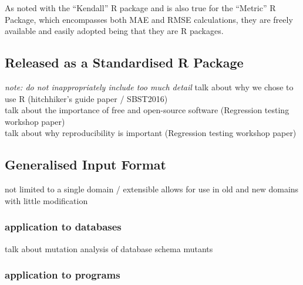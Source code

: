 As noted with the ``Kendall'' R package and is also true for the ``Metric'' R Package, which
encompasses both MAE and RMSE calculations, they are freely available and easily adopted being
that they are R packages.

\subsection{Released as a Standardised R Package}
\textit{note: do not inappropriately include too much detail}
talk about why we chose to use R (hitchhiker's guide paper / SBST2016)\\
talk about the importance of free and open-source software (Regression testing workshop paper)\\
talk about why reproducibility is important (Regression testing workshop paper)


\subsection{Generalised Input Format}
not limited to a single domain / extensible
allows for use in old and new domains with little modification
    \subsubsection{application to databases}
    talk about mutation analysis of database schema mutants
    \subsubsection{application to programs}

